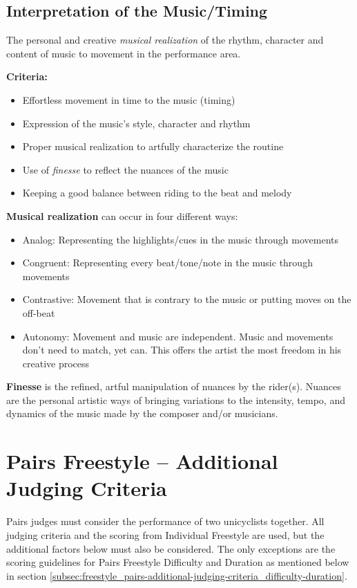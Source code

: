 \subsection{Interpretation of the Music/Timing}
The personal and creative \emph{musical realization} of the rhythm, character and content of music to movement in the performance area.

\textbf{Criteria:}
\begin{itemize}
\item Effortless movement in time to the music (timing)
\item Expression of the music's style, character and rhythm
\item Proper musical realization to artfully characterize the routine
\item Use of \emph{finesse} to reflect the nuances of the music
\item Keeping a good balance between riding to the beat and melody
\end{itemize}

\textbf{Musical realization} can occur in four different ways:
\begin{itemize}
\item Analog: Representing the highlights/cues in the music through movements
\item Congruent: Representing every beat/tone/note in the music through movements
\item Contrastive: Movement that is contrary to the music or putting moves on the off-beat
\item Autonomy: Movement and music are independent. Music and movements don't need to match, yet can. This offers the artist the most freedom in his creative process
\end{itemize}

\textbf{Finesse} is the refined, artful manipulation of nuances by the rider(s). Nuances are the personal artistic ways of bringing variations to the intensity, tempo, and dynamics of the music made by the composer and/or musicians.

\section{Pairs Freestyle -- Additional Judging Criteria}
Pairs judges must consider the performance of two unicyclists together.
All judging criteria and the scoring from Individual Freestyle are used, but the additional factors below must also be considered.
The only exceptions are the scoring guidelines for Pairs Freestyle Difficulty and Duration as mentioned below in section \ref{subsec:freestyle_pairs-additional-judging-criteria_difficulty-duration}.

